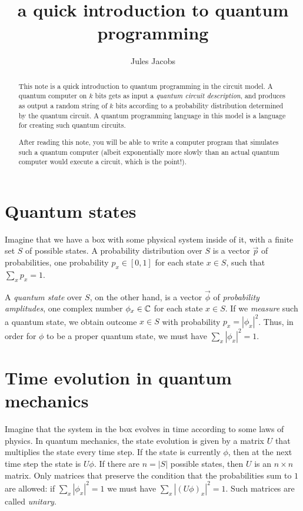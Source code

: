 
\usepackage{braket}
\usetikzlibrary{quantikz}

\title{a quick introduction to quantum programming}

\author{Jules Jacobs}


\maketitle

\begin{abstract}
  This note is a quick introduction to quantum programming in the circuit model.
  A quantum computer on $k$ bits gets as input a \emph{quantum circuit description},
  and produces as output a random string of $k$ bits according to a probability distribution determined by the quantum circuit.
  A quantum programming language in this model is a language for creating such quantum circuits.

  After reading this note, you will be able to write a computer program that simulates such a quantum computer
  (albeit exponentially more slowly than an actual quantum computer would execute a circuit, which is the point!).
\end{abstract}

\section{Quantum states}

Imagine that we have a box with some physical system inside of it, with a finite set $S$ of possible states.
A probability distribution over $S$ is a vector $\vec{p}$ of probabilities, one probability $p_x \in [0,1]$ for each state $x \in S$, such that $\sum_x p_x = 1$.

A \emph{quantum state} over $S$, on the other hand, is a vector $\vec{\phi}$ of \emph{probability amplitudes}, one complex number $\phi_x \in \mathbb{C}$ for each state $x \in S$.
If we \emph{measure} such a quantum state, we obtain outcome $x \in S$ with probability $p_x = |\phi_x|^2$.
Thus, in order for $\phi$ to be a proper quantum state, we must have $\sum_x |\phi_x|^2 = 1$.

\section{Time evolution in quantum mechanics}

Imagine that the system in the box evolves in time according to some laws of physics.
In quantum mechanics, the state evolution is given by a matrix $U$ that multiplies the state every time step.
If the state is currently $\phi$, then at the next time step the state is $U\phi$.
If there are $n = |S|$ possible states, then $U$ is an $n \times n$ matrix.
Only matrices that preserve the condition that the probabilities sum to $1$ are allowed: if $\sum_x |\phi_x|^2 = 1$ we must have $\sum_x |(U\phi)_x|^2 = 1$.
Such matrices are called \emph{unitary}.

